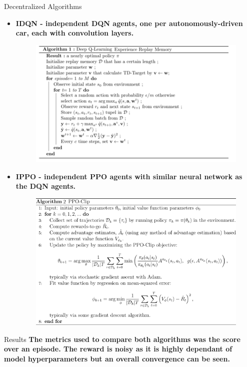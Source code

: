 \documentclass[final]{beamer}
\newlength{\onecolwid}
\begin{document}
\begin{frame}[t]
\begin{columns}[t]
\begin{column}{\onecolwid}
\begin{block}{Decentralized Algorithms}
    \begin{itemize}
        \item \textbf{IDQN - independent DQN agents, one per autonomously-driven car, each with convolution layers.}
        \begin{figure}[!ht]
            \vspace*{0.1cm}
            \includegraphics[width=0.7\linewidth, height=0.4\linewidth]{images/DQN-Algorithm.png}
        \end{figure}
        \item \textbf{IPPO - independent PPO agents with similar neural network as the DQN agents.}
        \begin{figure}[!ht]
            \vspace*{0.1cm}
            \includegraphics[width=0.7\linewidth, height=0.4\linewidth]{images/ppo_algorithm.png}
        \end{figure}
    \end{itemize}
 \end{block} 
 
\begin{block}{Results}
    \textbf{The metrics used to compare both algorithms was the score over an episode. The reward is noisy as it is highly dependant of model
    hyperparameters but an overall convergence can be seen.}

\end{block} 


\end{column}
\end{columns}
\end{frame}
\end{document}
